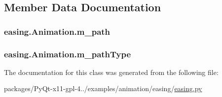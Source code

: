 \subsection{Member Data Documentation}
\hypertarget{classeasing_1_1Animation_ae3f3f6fab552a9998f9149a6e3c922b7}{}
\subsubsection[{m\+\_\+path}]{\setlength{\rightskip}{0pt plus 5cm}easing.\+Animation.\+m\+\_\+path}\label{classeasing_1_1Animation_ae3f3f6fab552a9998f9149a6e3c922b7}
\hypertarget{classeasing_1_1Animation_ab12abf69b1a0732c580389980cebc2c9}{}
\subsubsection[{m\+\_\+path\+Type}]{\setlength{\rightskip}{0pt plus 5cm}easing.\+Animation.\+m\+\_\+path\+Type}\label{classeasing_1_1Animation_ab12abf69b1a0732c580389980cebc2c9}


The documentation for this class was generated from the following file\+:\begin{DoxyCompactItemize}
\item 
packages/\+Py\+Qt-\/x11-\/gpl-\/4../examples/animation/easing/\hyperlink{easing_8py}{easing.\+py}\end{DoxyCompactItemize}
